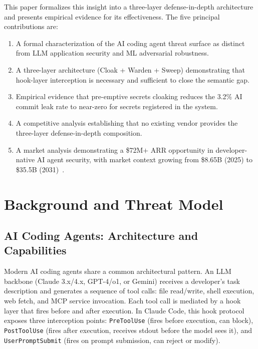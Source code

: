 \documentclass[11pt,letterpaper]{article}
\begin{document}
This paper formalizes this insight into a three-layer defense-in-depth architecture
and presents empirical evidence for its effectiveness. The five principal contributions are:
\begin{enumerate}[noitemsep,topsep=2pt]
  \item A formal characterization of the AI coding agent threat surface as distinct
        from LLM application security and ML adversarial robustness.
  \item A three-layer architecture (Cloak + Warden + Sweep) demonstrating that
        hook-layer interception is necessary and sufficient to close the semantic gap.
  \item Empirical evidence that pre-emptive secrets cloaking reduces the 3.2\% AI
        commit leak rate to near-zero for secrets registered in the system.
  \item A competitive analysis establishing that no existing vendor provides the
        three-layer defense-in-depth composition.
  \item A market analysis demonstrating a \$72M$+$ ARR opportunity in developer-native
        AI agent security, with market context growing from \$8.65B (2025) to \$35.5B
        (2031)~\citep{marketsandmarkets2026generative}.
\end{enumerate}

\section{Background and Threat Model}

\subsection{AI Coding Agents: Architecture and Capabilities}

Modern AI coding agents share a common architectural pattern. An LLM backbone (Claude
3.x/4.x, GPT-4/o1, or Gemini) receives a developer's task description and generates
a sequence of tool calls: file read/write, shell execution, web fetch, and MCP service
invocation. Each tool call is mediated by a hook layer that fires before and after
execution. In Claude Code, this hook protocol exposes three interception points:
\texttt{PreToolUse} (fires before execution, can block), \texttt{PostToolUse} (fires
after execution, receives stdout before the model sees it), and \texttt{UserPromptSubmit}
(fires on prompt submission, can reject or modify).
\end{document}
